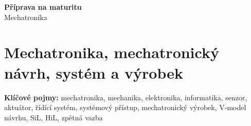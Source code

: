 \documentclass[a4paper,10pt]{article}
\begin{document}
\begin{minipage}[t]{0.75\textwidth}
    {\Huge\bfseries\color{accent} Příprava na maturitu}\\[4pt]
    {\large\color{stripeblue} Mechatronika}\\[2pt]
\end{minipage}

\section{Mechatronika, mechatronický návrh, systém a výrobek}

\begin{pojmybox}
\textbf{Klíčové pojmy:}
mechatronika, mechanika, elektronika, informatika,
senzor, aktuátor, řídící systém, systémový přístup, mechatronický výrobek,
V-model návrhu, SiL, HiL, zpětná vazba
\end{pojmybox}
\end{document}

